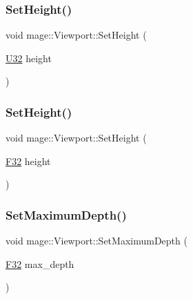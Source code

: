 \hypertarget{structmage_1_1_viewport_abe55d91495584c60ff1bc91a7f286329}{}\label{structmage_1_1_viewport_abe55d91495584c60ff1bc91a7f286329} 
\subsubsection{\texorpdfstring{Set\+Height()}{SetHeight()}\hspace{0.1cm}{\footnotesize\ttfamily [1/2]}}
{\footnotesize\ttfamily void mage\+::\+Viewport\+::\+Set\+Height (\begin{DoxyParamCaption}\item[{\hyperlink{namespacemage_a41c104c036fba3756a74e19f793eeaa1}{U32}}]{height }\end{DoxyParamCaption})\hspace{0.3cm}{\ttfamily [noexcept]}}

\hypertarget{structmage_1_1_viewport_a70a89b84a3dbe79475e10b4a61c0a34c}{}\label{structmage_1_1_viewport_a70a89b84a3dbe79475e10b4a61c0a34c} 
\subsubsection{\texorpdfstring{Set\+Height()}{SetHeight()}\hspace{0.1cm}{\footnotesize\ttfamily [2/2]}}
{\footnotesize\ttfamily void mage\+::\+Viewport\+::\+Set\+Height (\begin{DoxyParamCaption}\item[{\hyperlink{namespacemage_aa97e833b45f06d60a0a9c4fc22ae02c0}{F32}}]{height }\end{DoxyParamCaption})\hspace{0.3cm}{\ttfamily [noexcept]}}

\hypertarget{structmage_1_1_viewport_a5f3d52bcaeaa3048d4da86e363131455}{}\label{structmage_1_1_viewport_a5f3d52bcaeaa3048d4da86e363131455} 
\subsubsection{\texorpdfstring{Set\+Maximum\+Depth()}{SetMaximumDepth()}}
{\footnotesize\ttfamily void mage\+::\+Viewport\+::\+Set\+Maximum\+Depth (\begin{DoxyParamCaption}\item[{\hyperlink{namespacemage_aa97e833b45f06d60a0a9c4fc22ae02c0}{F32}}]{max\+\_\+depth }\end{DoxyParamCaption})\hspace{0.3cm}{\ttfamily [noexcept]}}

